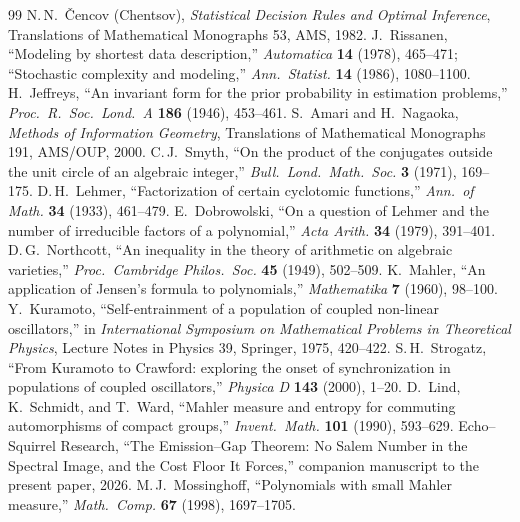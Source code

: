 \documentclass[11pt]{article}
\theoremstyle{plain}
\theoremstyle{definition}
\theoremstyle{remark}
\begin{document}
\begin{thebibliography}{99}
 N.\,N.~\v{C}encov (Chentsov), \emph{Statistical Decision Rules and Optimal Inference}, Translations of Mathematical Monographs 53, AMS, 1982.
 J.~Rissanen, ``Modeling by shortest data description,'' \emph{Automatica} \textbf{14} (1978), 465--471; ``Stochastic complexity and modeling,'' \emph{Ann.\ Statist.} \textbf{14} (1986), 1080--1100.
 H.~Jeffreys, ``An invariant form for the prior probability in estimation problems,'' \emph{Proc.\ R.\ Soc.\ Lond.\ A} \textbf{186} (1946), 453--461.
 S.~Amari and H.~Nagaoka, \emph{Methods of Information Geometry}, Translations of Mathematical Monographs 191, AMS/OUP, 2000.
 C.\,J.~Smyth, ``On the product of the conjugates outside the unit circle of an algebraic integer,'' \emph{Bull.\ Lond.\ Math.\ Soc.} \textbf{3} (1971), 169--175.
 D.\,H.~Lehmer, ``Factorization of certain cyclotomic functions,'' \emph{Ann.\ of Math.} \textbf{34} (1933), 461--479.
 E.~Dobrowolski, ``On a question of Lehmer and the number of irreducible factors of a polynomial,'' \emph{Acta Arith.} \textbf{34} (1979), 391--401.
 D.\,G.~Northcott, ``An inequality in the theory of arithmetic on algebraic varieties,'' \emph{Proc.\ Cambridge Philos.\ Soc.} \textbf{45} (1949), 502--509.
 K.~Mahler, ``An application of Jensen's formula to polynomials,'' \emph{Mathematika} \textbf{7} (1960), 98--100.
 Y.~Kuramoto, ``Self-entrainment of a population of coupled non-linear oscillators,'' in \emph{International Symposium on Mathematical Problems in Theoretical Physics}, Lecture Notes in Physics 39, Springer, 1975, 420--422.
 S.\,H.~Strogatz, ``From Kuramoto to Crawford: exploring the onset of synchronization in populations of coupled oscillators,'' \emph{Physica D} \textbf{143} (2000), 1--20.
 D.~Lind, K.~Schmidt, and T.~Ward, ``Mahler measure and entropy for commuting automorphisms of compact groups,'' \emph{Invent.\ Math.} \textbf{101} (1990), 593--629.
 Echo--Squirrel Research, ``The Emission--Gap Theorem: No Salem Number in the Spectral Image, and the Cost Floor It Forces,'' companion manuscript to the present paper, 2026.
 M.\,J.~Mossinghoff, ``Polynomials with small Mahler measure,'' \emph{Math.\ Comp.} \textbf{67} (1998), 1697--1705.
\end{thebibliography}
\end{document}
